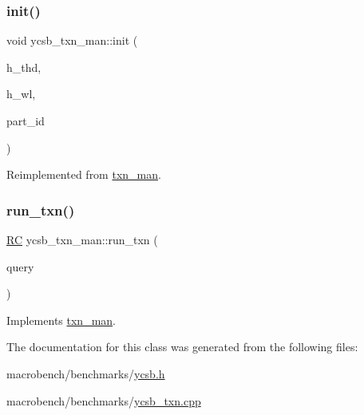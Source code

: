 \subsubsection{\texorpdfstring{init()}{init()}}
{\footnotesize\ttfamily void ycsb\+\_\+txn\+\_\+man\+::init (\begin{DoxyParamCaption}\item[{\hyperlink{classthread__t}{thread\+\_\+t} $\ast$}]{h\+\_\+thd,  }\item[{\hyperlink{classworkload}{workload} $\ast$}]{h\+\_\+wl,  }\item[{uint64\+\_\+t}]{part\+\_\+id }\end{DoxyParamCaption})\hspace{0.3cm}{\ttfamily [virtual]}}



Reimplemented from \hyperlink{classtxn__man_a778925bb3edd6a54a27161f67792edec}{txn\+\_\+man}.

\mbox{\label{classycsb__txn__man_ab219e46d2d5149677ad391ebb83d6e05}} 
\subsubsection{\texorpdfstring{run\+\_\+txn()}{run\_txn()}}
{\footnotesize\ttfamily \hyperlink{global_8h_a78c49a674c810fdd03d20432f7be864a}{RC} ycsb\+\_\+txn\+\_\+man\+::run\+\_\+txn (\begin{DoxyParamCaption}\item[{\hyperlink{classbase__query}{base\+\_\+query} $\ast$}]{query }\end{DoxyParamCaption})\hspace{0.3cm}{\ttfamily [virtual]}}



Implements \hyperlink{classtxn__man_a71142ded36a4be5629ea75d486a105ae}{txn\+\_\+man}.



The documentation for this class was generated from the following files\+:\begin{DoxyCompactItemize}
\item 
macrobench/benchmarks/\hyperlink{ycsb_8h}{ycsb.\+h}\item 
macrobench/benchmarks/\hyperlink{ycsb__txn_8cpp}{ycsb\+\_\+txn.\+cpp}\end{DoxyCompactItemize}
